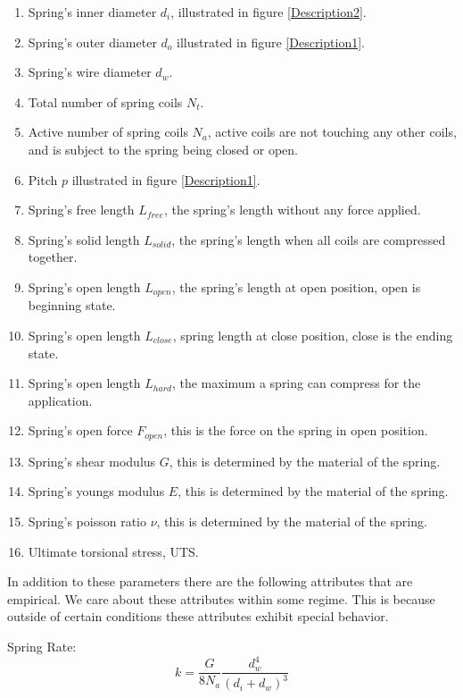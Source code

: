 \documentclass[10pt]{article}
\begin{document}
		\begin{enumerate}
			\item Spring's inner diameter $d_{i}$, illustrated in figure \ref{Description2}.
			\item Spring's outer diameter $d_{o}$ illustrated in figure \ref{Description1}.
			\item Spring's wire diameter $d_{w}$.
			\item Total number of spring coils $N_{t}$.
			\item Active number of spring coils $N_{a}$, active coils are not touching any other coils, and is subject to the spring being closed or open. 
			\item Pitch $p$ illustrated in figure \ref{Description1}.
			\item Spring's free length $L_{free}$, the spring's length without any force applied. 
			
			\item Spring's solid length $L_{solid}$, the spring's length when all coils are compressed together.
			\item Spring's open length $L_{open}$, the spring's length at open position, open is beginning state.
			\item Spring's open length $L_{close}$, spring length at close position, close is the ending state.
			\item Spring's open length $L_{hard}$, the maximum a spring can compress for the application.
			\item Spring's open force $F_{open}$, this is the force on the spring in open position.
			
			
			\item Spring's shear modulus $G$, this is determined by the material of the spring.
			\item Spring's youngs modulus $E$, this is determined by the material of the spring.
			\item Spring's poisson ratio $\nu$, this is determined by the material of the spring.
			\item Ultimate torsional stress, UTS. 
		
		\end{enumerate}
		
		In addition to these parameters there are the following attributes that are empirical. We care about these attributes within some regime. This is because outside of certain conditions these attributes exhibit special behavior. 
		
			Spring Rate:\begin{equation} k = \frac{G}{8N_{a}}\frac{d_{w}^{4}}{(d_{i} + d_{w})^{3}}\end{equation}
				
\end{document}
